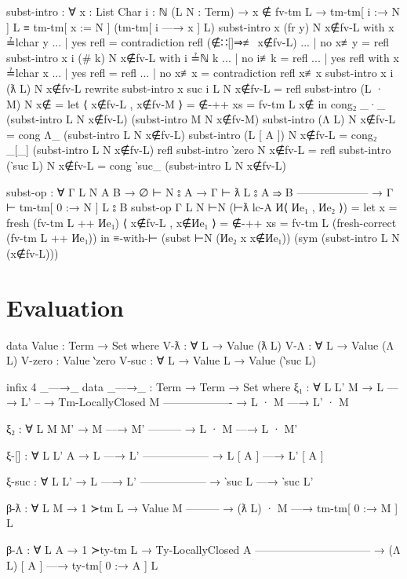 \documentclass[logo,bsc,singlespacing,parskip,online]{infthesis}
\renewenvironment{code}{\mintedcopy[breaklines,breaksymbolleft=\;]{agda}}{\endmintedcopy}
\begin{document}
\begin{code}
  subst-intro : ∀ {x : List Char} {i : ℕ} (L N : Term)
    → x ∉ fv-tm L
    → tm-tm[ i :→ N ] L ≡ tm-tm[ x := N ] (tm-tm[ i —→ x ] L)
  subst-intro {x} (fr y) N x∉fv-L with x ≟lchar y
  ... | yes refl = contradiction refl (∉∷[]⇒≢ x∉fv-L)
  ... | no  x≢y  = refl
  subst-intro {x} {i} (# k) N x∉fv-L with i ≟ℕ k
  ... | no  i≢k = refl
  ... | yes refl with x ≟lchar x
  ...   | yes refl = refl
  ...   | no  x≢x  = contradiction refl x≢x
  subst-intro {x} {i} (ƛ L) N x∉fv-L
    rewrite subst-intro {x} {suc i} L N x∉fv-L = refl
  subst-intro (L · M) N x∉ = let ⟨ x∉fv-L , x∉fv-M ⟩ = ∉-++ {xs = fv-tm L} x∉
    in cong₂ _·_ (subst-intro L N x∉fv-L) (subst-intro M N x∉fv-M)
  subst-intro (Λ L) N x∉fv-L = cong Λ_ (subst-intro L N x∉fv-L)
  subst-intro (L [ A ]) N x∉fv-L = cong₂ _[_] (subst-intro L N x∉fv-L) refl
  subst-intro ‵zero N x∉fv-L = refl
  subst-intro (‵suc L) N x∉fv-L = cong ‵suc_ (subst-intro L N x∉fv-L)

  subst-op : ∀ {Γ L N A B}
    → ∅ ⊢ N ⦂ A
    → Γ ⊢ ƛ L ⦂ A ⇒ B
      --------------------
    → Γ ⊢ tm-tm[ 0 :→ N ] L ⦂ B
  subst-op {Γ} {L} {N} ⊢N (⊢ƛ lc-A И⟨ Иe₁ , Иe₂ ⟩) =
    let x                  = fresh (fv-tm L ++ Иe₁)
        ⟨ x∉fv-L , x∉Иe₁ ⟩ = ∉-++ {xs = fv-tm L}
                                (fresh-correct (fv-tm L ++ Иe₁))
    in ≡-with-⊢
      (subst ⊢N (Иe₂ x {x∉Иe₁}))
      (sym (subst-intro L N (x∉fv-L)))
\end{code}

\section{Evaluation}
\begin{code}
  data Value : Term → Set where
    V-ƛ : ∀ {L} → Value (ƛ L)
    V-Λ : ∀ {L} → Value (Λ L)
    V-zero : Value ‵zero
    V-suc : ∀ {L} → Value L → Value (‵suc L)
\end{code}


\begin{code}
  infix 4 _—→_
  data _—→_ : Term → Term → Set where
    ξ₁ : ∀ {L L' M}
      → L —→ L'
      -- → Tm-LocallyClosed M
        -------------------
      → L · M —→ L' · M

    ξ₂ : ∀ {L M M'}
      → M —→ M'
        ---------
      → L · M —→ L · M'

    ξ-[] : ∀ {L L' A}
      → L —→ L'
        ------------------
      → L [ A ] —→ L' [ A ]

    ξ-suc : ∀ {L L'}
      → L —→ L'
        ------------------
      → ‵suc L —→ ‵suc L'

    β-ƛ : ∀ {L M}
      → 1 ≻tm L
      → Value M
        ---------
      → (ƛ L) · M —→ tm-tm[ 0 :→ M ] L

    β-Λ : ∀ {L A}
      → 1 ≻ty-tm L
      → Ty-LocallyClosed A
        --------------------------------
      → (Λ L) [ A ] —→ ty-tm[ 0 :→ A ] L
\end{code}
\end{document}
